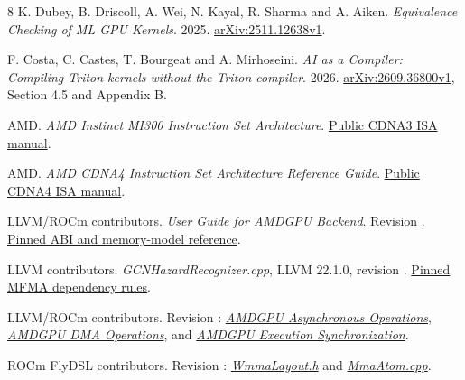 \documentclass[10pt,letterpaper]{article}
\newcommand{\code}[1]{\texttt{\detokenize{#1}}}
\begin{document}
\small\raggedright
\begin{thebibliography}{8}
K. Dubey, B. Driscoll, A. Wei, N. Kayal, R. Sharma and A. Aiken.
\emph{Equivalence Checking of ML GPU Kernels}. 2025.
\href{https://arxiv.org/html/2511.12638v1}{arXiv:2511.12638v1}.

F. Costa, C. Castes, T. Bourgeat and A. Mirhoseini.
\emph{AI as a Compiler: Compiling Triton kernels without the Triton compiler}.
2026. \href{https://arxiv.org/html/2609.36800v1}{arXiv:2609.36800v1}, Section 4.5 and Appendix B.

AMD. \emph{AMD Instinct MI300 Instruction Set Architecture}.
\href{https://www.amd.com/content/dam/amd/en/documents/instinct-tech-docs/instruction-set-architectures/amd-instinct-mi300-cdna3-instruction-set-architecture.pdf}{Public CDNA3 ISA manual}.

AMD. \emph{AMD CDNA4 Instruction Set Architecture Reference Guide}.
\href{https://www.amd.com/content/dam/amd/en/documents/instinct-tech-docs/instruction-set-architectures/amd-instinct-cdna4-instruction-set-architecture.pdf}{Public CDNA4 ISA manual}.

LLVM/ROCm contributors. \emph{User Guide for AMDGPU Backend}.
Revision \code{5fd50ec8}.
\href{https://github.com/ROCm/llvm-project/blob/5fd50ec8e07abb94e203933017e8d6e40fb51824/llvm/docs/AMDGPUUsage.md}{Pinned ABI and memory-model reference}.

LLVM contributors. \emph{GCNHazardRecognizer.cpp}, LLVM 22.1.0,
revision \code{4434dabb}.
\href{https://github.com/llvm/llvm-project/blob/4434dabb69916856b824f68a64b029c67175e532/llvm/lib/Target/AMDGPU/GCNHazardRecognizer.cpp}{Pinned MFMA dependency rules}.

LLVM/ROCm contributors. Revision \code{5fd50ec8}:
\href{https://github.com/ROCm/llvm-project/blob/5fd50ec8e07abb94e203933017e8d6e40fb51824/llvm/docs/AMDGPUAsyncOperations.md}{\emph{AMDGPU Asynchronous Operations}},
\href{https://github.com/ROCm/llvm-project/blob/5fd50ec8e07abb94e203933017e8d6e40fb51824/llvm/docs/AMDGPUDMAOperations.md}{\emph{AMDGPU DMA Operations}}, and
\href{https://github.com/ROCm/llvm-project/blob/5fd50ec8e07abb94e203933017e8d6e40fb51824/llvm/docs/AMDGPUExecutionSynchronization.md}{\emph{AMDGPU Execution Synchronization}}.

ROCm FlyDSL contributors. Revision \code{f37f7a2b}:
\href{https://github.com/ROCm/FlyDSL/blob/f37f7a2b98f295902240f9f96612222003578b40/lib/Dialect/FlyROCDL/GFX1250/WmmaLayout.h}{\emph{WmmaLayout.h}} and
\href{https://github.com/ROCm/FlyDSL/blob/f37f7a2b98f295902240f9f96612222003578b40/lib/Dialect/FlyROCDL/GFX1250/MmaAtom.cpp}{\emph{MmaAtom.cpp}}.
\end{thebibliography}
\end{document}
